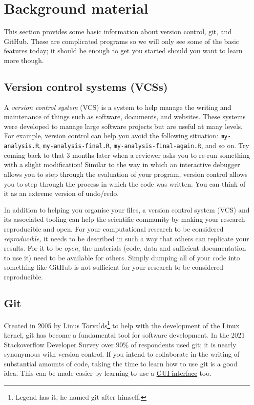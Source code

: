\documentclass[11pt,onecolumn]{scrartcl}
\begin{document}
\section{Background material}
\label{sec:orgeb40031}

This section provides some basic information about version control, git, and
GitHub. These are complicated programs so we will only see some of the basic
features today; it should be enough to get you started should you want to learn
more though.

\subsection{Version control systems (VCSs)}
\label{sec:orgf5ee3af}

A \emph{version control system} (VCS) is a system to help manage the writing and
maintenance of things such as software, documents, and websites. These systems
were developed to manage large software projects but are useful at many levels.
For example, version control can help you avoid the following situation:
\texttt{my-analysis.R}, \texttt{my-analysis-final.R}, \texttt{my-analysis-final-again.R}, and so on.
Try coming back to that 3 months later when a reviewer asks you to re-run
something with a slight modification! Similar to the way in which an interactive
debugger allows you to step through the evaluation of your program, version
control allows you to step through the process in which the code was written.
You can think of it as an extreme version of undo/redo.

In addition to helping you organise your files, a version control system (VCS)
and its associated tooling can help the scientific community by making your
research reproducible and open. For your computational research to be considered
\emph{reproducible,} it needs to be described in such a way that others can replicate
your results. For it to be \emph{open}, the materials (code, data and sufficient
documentation to use it) need to be available for others. Simply dumping all of
your code into something like GitHub is not sufficient for your research to be
considered reproducible.

\subsection{Git}
\label{sec:org799aa54}

Created in 2005 by Linus Torvalds\footnote{Legend has it, he named git after himself.} to help with the development of the
Linux kernel, git has become a fundamental tool for software development. In the
2021 Stackoverflow Developer Survey over \(90\%\) of respondents used git; it is
nearly synonymous with version control. If you intend to collaborate in the
writing of substantial amounts of code, taking the time to learn how to use git
is a good idea. This can be made easier by learning to use a \hyperref[sec:orgf18f21c]{GUI interface} too.
\end{document}
